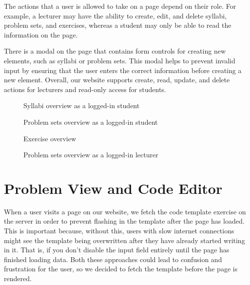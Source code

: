 The actions that a user is allowed to take on a page depend on their role. For example, a lecturer may have the ability to create, edit, and delete syllabi, problem sets, and exercises, whereas a student may only be able to read the information on the page.

There is a modal on the page that contains form controls for creating new elements, such as syllabi or problem sets.
This modal helps to prevent invalid input by ensuring that the user enters the correct information before creating a new element.
Overall, our website supports create, read, update, and delete actions for lecturers and read-only access for students.

\begin{figure}[H]
    \centering
    \caption{Syllabi overview as a logged-in student}
    \label{fig:syllabi}
\end{figure}

\begin{figure}[H]
    \centering
    \caption{Problem sets overview as a logged-in student}
    \label{fig:problemsets}
\end{figure}

\begin{figure}[H]
    \centering
    \caption{Exercise overview}
    \label{fig:exercise_overview}
\end{figure}

\begin{figure}[H]
    \centering
    \caption{Problem sets overview as a logged-in lecturer}
    \label{fig:problemsets_teacher_view}
\end{figure}

\section{Problem View and Code Editor}
When a user visits a page on our website, we fetch the code template exercise on the server in order to prevent flashing in the template after the page has loaded.
This is important because, without this, users with slow internet connections might see the template being overwritten after they have already started writing in it. That is, if you don't disable the input field entirely until the page has finished loading data. Both these approaches could lead to confusion and frustration for the user, so we decided to fetch the template before the page is rendered.

